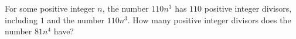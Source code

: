 For some positive integer $n$, the number $110n^3$ has $110$ positive integer divisors, including $1$ and the number $110n^3$. How many positive integer divisors does the number $81n^4$ have?
